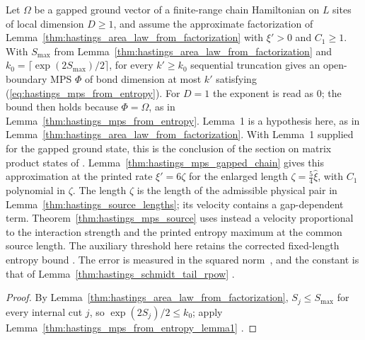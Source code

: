 \begin{lemma}
    \label{thm:hastings_mps_ground_state}
    \leanok
    Let $\Omega$ be a gapped ground vector of a finite-range chain Hamiltonian
    on $L$ sites of local dimension $D\ge1$, and assume the approximate
    factorization of Lemma~\ref{thm:hastings_area_law_from_factorization} with
    $\xi'>0$ and $C_1\ge1$. With $S_{\max}$ from
    Lemma~\ref{thm:hastings_area_law_from_factorization} and
    $k_0=\lceil\exp(2S_{\max})/2\rceil$, for every $k'\ge k_0$ sequential
    truncation gives an open-boundary MPS $\Phi$ of bond dimension at most $k'$
    satisfying (\ref{eq:hastings_mps_from_entropy}).
    For $D=1$ the exponent is read as $0$; the bound then holds because
    $\Phi=\Omega$, as in Lemma~\ref{thm:hastings_mps_from_entropy}.
    Lemma~1 is a hypothesis here, as in
    Lemma~\ref{thm:hastings_area_law_from_factorization}. With Lemma~1
    supplied for the gapped ground state, this is the conclusion of the section
    on matrix product states of \cite{Hastings2007AreaLaw}.
    Lemma~\ref{thm:hastings_mps_gapped_chain} gives this approximation at the
    printed rate $\xi'=6\zeta$ for the enlarged length
    $\zeta=\tfrac54\hat\xi$, with $C_1$ polynomial in $\zeta$. The length
    $\zeta$ is the length of the admissible physical pair in
    Lemma~\ref{thm:hastings_source_lengths}; its velocity contains a
    gap-dependent term. Theorem~\ref{thm:hastings_mps_source} uses instead
    a velocity proportional to the interaction strength and the printed
    entropy maximum at the common source length. The auxiliary threshold
    here retains the corrected fixed-length entropy bound
    \cite{gap:hastings07_lemma1_decay_length,gap:hastings07_doubling_constants}.
    The error is measured in
    the squared norm~\cite{gap:hastings07_mps_error_measure}, and the constant
    is that of Lemma~\ref{thm:hastings_schmidt_tail_rpow}
    \cite{gap:hastings07_schmidt_tail_constant}.
\end{lemma}
\begin{proof}\leanok
    By Lemma~\ref{thm:hastings_area_law_from_factorization}, $S_j\le S_{\max}$
    for every internal cut $j$, so $\exp(2S_j)/2\le k_0$; apply
    Lemma~\ref{thm:hastings_mps_from_entropy_lemma1}
    \cite{gap:hastings07_mps_entropy_stage}.
\end{proof}

